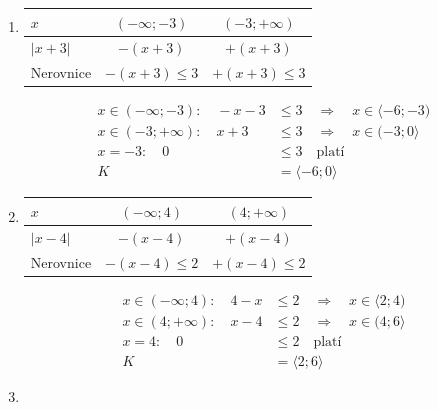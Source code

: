 \documentclass[11pt,a4paper]{article}
\begin{document}
\begin{zadaniReseniBox}[title={Domácí úkol}]
\begin{enumerate}[label=\alph*),itemsep=1pt]
\[\begin{aligned}
x=2:\quad 0 &> 4\quad\text{neplatí}\\[2pt]
K&=(-\infty;-2)\cup(6;+\infty)\end{aligned}\]
\item
\begin{center}
\begingroup\footnotesize
\renewcommand{\arraystretch}{1.32}
\begin{tabular}{@{}lcc@{}}
\toprule
$x$ & $(-\infty;-3)$ & $(-3;+\infty)$ \\
\midrule
$|x + 3|$ & $-(x + 3)$ & $+(x + 3)$ \\
\midrule
Nerovnice & $-(x + 3)\le3$ & $+(x + 3)\le3$ \\
\bottomrule
\end{tabular}
\endgroup
\end{center}
\[\begin{aligned}x\in (-\infty;-3):\quad - x - 3 &\le 3\quad\Longrightarrow\quad x\in\langle-6;-3)\\[2pt]
x\in (-3;+\infty):\quad x + 3 &\le 3\quad\Longrightarrow\quad x\in(-3;0\rangle\\[2pt]
x=-3:\quad 0 &\le 3\quad\text{platí}\\[2pt]
K&=\langle-6;0\rangle\end{aligned}\]
\item
\begin{center}
\begingroup\footnotesize
\renewcommand{\arraystretch}{1.32}
\begin{tabular}{@{}lcc@{}}
\toprule
$x$ & $(-\infty;4)$ & $(4;+\infty)$ \\
\midrule
$|x - 4|$ & $-(x - 4)$ & $+(x - 4)$ \\
\midrule
Nerovnice & $-(x - 4)\le2$ & $+(x - 4)\le2$ \\
\bottomrule
\end{tabular}
\endgroup
\end{center}
\[\begin{aligned}x\in (-\infty;4):\quad 4 - x &\le 2\quad\Longrightarrow\quad x\in\langle2;4)\\[2pt]
x\in (4;+\infty):\quad x - 4 &\le 2\quad\Longrightarrow\quad x\in(4;6\rangle\\[2pt]
x=4:\quad 0 &\le 2\quad\text{platí}\\[2pt]
K&=\langle2;6\rangle\end{aligned}\]
\item
\begin{center}
\begingroup\footnotesize
\renewcommand{\arraystretch}{1.32}
\begin{tabular}{@{}lcc@{}}
\toprule

\end{tabular}
\end{center}
\end{enumerate}
\end{zadaniReseniBox}
\end{document}
